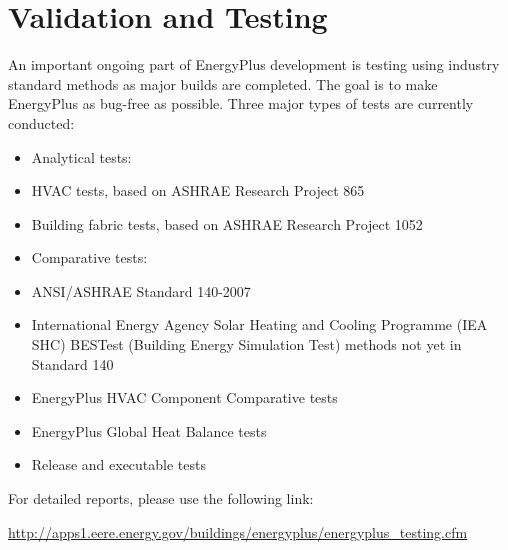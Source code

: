 \chapter{Validation and Testing}\label{validation-and-testing}

An important ongoing part of EnergyPlus development is testing using industry standard methods as major builds are completed. The goal is to make EnergyPlus as bug-free as possible. Three major types of tests are currently conducted:

\begin{itemize}
\item
  Analytical tests:
\item
  HVAC tests, based on ASHRAE Research Project 865
\item
  Building fabric tests, based on ASHRAE Research Project 1052
\item
  Comparative tests:
\item
  ANSI/ASHRAE Standard 140-2007
\item
  International Energy Agency Solar Heating and Cooling Programme (IEA SHC) BESTest (Building Energy Simulation Test) methods not yet in Standard 140
\item
  EnergyPlus HVAC Component Comparative tests
\item
  EnergyPlus Global Heat Balance tests
\item
  Release and executable tests
\end{itemize}

For detailed reports, please use the following link:

\url{http://apps1.eere.energy.gov/buildings/energyplus/energyplus_testing.cfm}
